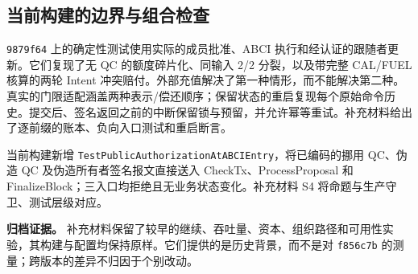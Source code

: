 

\subsection{当前构建的边界与组合检查}
\label{sec:eval-boundaries}
\texttt{9879f64} 上的确定性测试使用实际的成员批准、ABCI 执行和经认证的跟随者更新。它们复现了无 QC 的额度碎片化、同输入 2/2 分裂，以及带完整 CAL/FUEL 核算的两轮 Intent 冲突赔付。外部充值解决了第一种情形，而不能解决第二种。真实的门限适配涵盖两种表示/偿还顺序；保留状态的重启复现每个原始命令历史。提交后、签名返回之前的中断保留锁与预留，并允许幂等重试。补充材料给出了逐前缀的账本、负向入口测试和重启断言。

当前构建新增 \texttt{TestPublicAuthorization\allowbreak AtABCIEntry}，将已编码的挪用 QC、伪造 QC 及伪造所有者签名报文直接送入 CheckTx、ProcessProposal 和 FinalizeBlock；三入口均拒绝且无业务状态变化。补充材料 S4 将命题与生产守卫、测试层级对应。

\noindent\textbf{归档证据。}
补充材料保留了较早的继续、吞吐量、资本、组织路径和可用性实验，其构建与配置均保持原样。它们提供的是历史背景，而不是对 \texttt{f856c7b} 的测量；跨版本的差异不归因于个别改动。
